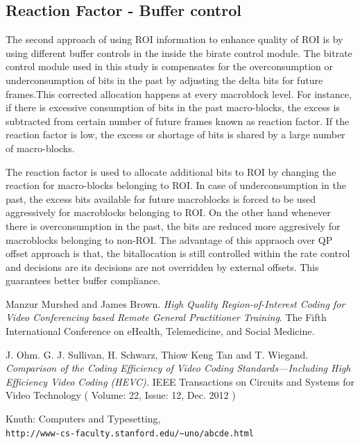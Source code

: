 \documentclass[11pt]{article} %
\begin{document}
\subsection{Reaction Factor - Buffer control} 
The second approach of using ROI information to enhance quality of ROI is by using different buffer controls in the inside the birate control module. The bitrate control module used in this study is compensates for the overconsumption or underconsumption of bits in the past by adjusting the delta bits for future frames.This corrected allocation happens at every macroblock level. For instance, if there is excessive consumption of bits in the past macro-blocks, the excess is subtracted from certain number of future frames known as reaction factor. If the reaction factor is low, the excess or shortage of bits is shared by a large number of macro-blocks.

The reaction factor is used to allocate additional bits to ROI by changing the reaction for macro-blocks belonging to ROI. In case of underconsumption in the past, the excess bits available for future macroblocks is forced to be used aggressively for macroblocks belonging to ROI. On the other hand whenever there is overconsumption in the past, the bits are reduced more aggresively for macroblocks belonging to non-ROI. The advantage of this appraoch over QP offset approach is that, the bitallocation is still controlled within the rate control and decisions are its decisions are not overridden by external offsets. This guarantees better buffer compliance. 
%
%
%
%
%
\clearpage
\begin{thebibliography}{9}
Manzur Murshed and James Brown. 
\textit{High Quality Region-of-Interest Coding for Video Conferencing based Remote General Practitioner Training}. 
The Fifth International Conference on eHealth, Telemedicine, and Social Medicine.
 
J. Ohm. G. J. Sullivan, H. Schwarz, Thiow Keng Tan and T. Wiegand.
\textit{Comparison of the Coding Efficiency of Video Coding Standards—Including High Efficiency Video Coding (HEVC).}
 IEEE Transactions on Circuits and Systems for Video Technology ( Volume: 22, Issue: 12, Dec. 2012 )
 
Knuth: Computers and Typesetting,
\\\texttt{http://www-cs-faculty.stanford.edu/\~{}uno/abcde.html}
\end{thebibliography}
\end{document}
